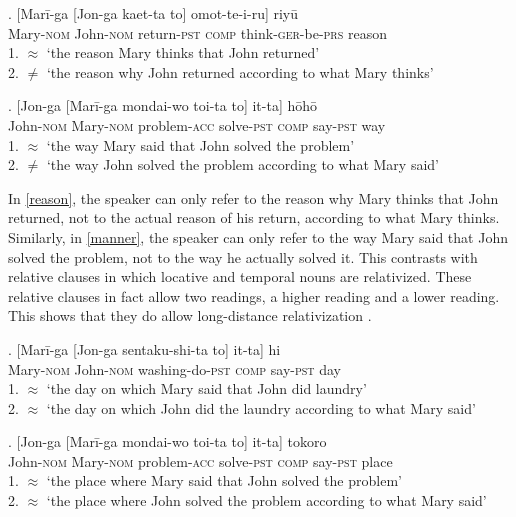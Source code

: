 \exg. [Marī-ga [Jon-ga kaet-ta to] omot-te-i-ru] riyū \label{reason}\\
Mary-\textsc{nom} John-\textsc{nom} return-\textsc{pst} \textsc{comp} think-\textsc{ger}-be-\textsc{prs} reason\\
1. $\approx$ `the reason Mary thinks that John returned’\\
2. $\neq$ `the reason why John returned according to what Mary thinks' \\ \null \hfill \citep[185]{murasugi:1991:noun}


\exg. [Jon-ga [Marī-ga mondai-wo toi-ta to] it-ta] hōhō \label{manner}\\
John-\textsc{nom} Mary-\textsc{nom} problem-\textsc{acc} solve-\textsc{pst} \textsc{comp} say-\textsc{pst} way\\
1. $\approx$ `the way Mary said that John solved the problem’\\
2. $\neq$ `the way John solved the problem according to what Mary said’ \\ \null \hfill \citep[133]{murasugi:1991:noun}

In \ref{reason}, the speaker can only refer to the reason why Mary thinks that John returned, not to the actual reason of his return, according to what Mary thinks. Similarly, in \ref{manner}, the speaker can only refer to the way Mary said that John solved the problem, not to the way he actually solved it. This contrasts with relative clauses in which locative and temporal nouns are relativized. These relative clauses in fact allow two readings, a higher reading and a lower reading. This shows that they do allow long-distance relativization \citep[133–134]{murasugi:1991:noun}.  

\exg. [Marī-ga [Jon-ga sentaku-shi-ta to] it-ta] hi \label{hi}\\
Mary-\textsc{nom} John-\textsc{nom} washing-do-\textsc{pst} \textsc{comp} say-\textsc{pst} day\\
1. $\approx$ `the day on which Mary said that John did laundry’\\
2. $\approx$ `the day on which John did the laundry according to what Mary said’ \\ \null \hfill \citep[134]{murasugi:1991:noun}

\exg. [Jon-ga [Marī-ga mondai-wo toi-ta to] it-ta] tokoro\\
John-\textsc{nom} Mary-\textsc{nom} problem-\textsc{acc} solve-\textsc{pst} \textsc{comp} say-\textsc{pst} place\\
1. $\approx$ `the place where Mary said that John solved the problem’\\
2. $\approx$ `the place where John solved the problem according to what Mary said’ \\ \null \hfill \citep[134]{murasugi:1991:noun}

